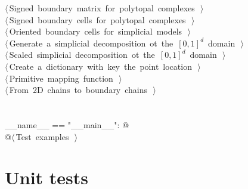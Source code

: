 \documentclass[11pt,oneside]{article}    %
\begin{document}
\begin{flushleft}
\begin{list}{}{}
\mbox{}\verb@@\hbox{$\langle\,$Signed boundary matrix for polytopal complexes\nobreak\ {\footnotesize {}}$\,\rangle$}\verb@@\\
\mbox{}\verb@@\hbox{$\langle\,$Signed boundary cells for polytopal complexes\nobreak\ {\footnotesize {}}$\,\rangle$}\verb@@\\
\mbox{}\verb@@\hbox{$\langle\,$Oriented boundary cells for simplicial models\nobreak\ {\footnotesize {}}$\,\rangle$}\verb@@\\
\mbox{}\verb@@\hbox{$\langle\,$Generate a simplicial decomposition ot the $[0,1]^d$ domain\nobreak\ {\footnotesize {}}$\,\rangle$}\verb@@\\
\mbox{}\verb@@\hbox{$\langle\,$Scaled simplicial decomposition ot the $[0,1]^d$ domain\nobreak\ {\footnotesize {}}$\,\rangle$}\verb@@\\
\mbox{}\verb@@\hbox{$\langle\,$Create a dictionary with key the point location\nobreak\ {\footnotesize {}}$\,\rangle$}\verb@@\\
\mbox{}\verb@@\hbox{$\langle\,$Primitive mapping function\nobreak\ {\footnotesize {}}$\,\rangle$}\verb@@\\
\mbox{}\verb@@\hbox{$\langle\,$From 2D chains to boundary chains\nobreak\ {\footnotesize {}}$\,\rangle$}\verb@@\\
\mbox{}\verb@@\\
\mbox{}\verb@@\\
\mbox{}\verb@if __name__ == "__main__": @\\
\mbox{}\verb@    @\hbox{$\langle\,$Test examples\nobreak\ {\footnotesize {}}$\,\rangle$}\verb@@\\
\mbox{}\verb@@{\NWsep}
\end{list}
\vspace{-2ex}
\end{flushleft}

\section{Unit tests}
\end{document}
